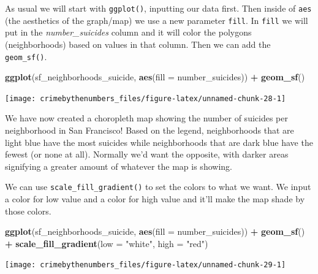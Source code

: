 \documentclass[
  12pt,
]{book}
\newenvironment{Shaded}{\begin{snugshade}}{\end{snugshade}}
\newcommand{\DataTypeTok}[1]{\textcolor[rgb]{0.27,0.27,0.27}{#1}}
\newcommand{\KeywordTok}[1]{\textcolor[rgb]{0.27,0.27,0.27}{\textbf{#1}}}
\newcommand{\NormalTok}[1]{#1}
\newcommand{\OperatorTok}[1]{\textcolor[rgb]{0.43,0.43,0.43}{\textbf{#1}}}
\newcommand{\StringTok}[1]{\textcolor[rgb]{0.5,0.5,0.5}{#1}}
\begin{document}
As usual we will start with \texttt{ggplot()}, inputting our data first. Then inside of \texttt{aes} (the aesthetics of the graph/map) we use a new parameter \texttt{fill}. In \texttt{fill} we will put in the \emph{number\_suicides} column and it will color the polygons (neighborhoods) based on values in that column. Then we can add the \texttt{geom\_sf()}.

\begin{Shaded}
\begin{Highlighting}[]
\KeywordTok{ggplot}\NormalTok{(sf\_neighborhoods\_suicide, }\KeywordTok{aes}\NormalTok{(}\DataTypeTok{fill =}\NormalTok{ number\_suicides)) }\OperatorTok{+}
\StringTok{  }\KeywordTok{geom\_sf}\NormalTok{() }
\end{Highlighting}
\end{Shaded}

\begin{center}\texttt{[image: crimebythenumbers\_files/figure-latex/unnamed-chunk-28-1]} \end{center}

We have now created a choropleth map showing the number of suicides per neighborhood in San Francisco! Based on the legend, neighborhoods that are light blue have the most suicides while neighborhoods that are dark blue have the fewest (or none at all). Normally we'd want the opposite, with darker areas signifying a greater amount of whatever the map is showing.

We can use \texttt{scale\_fill\_gradient()} to set the colors to what we want. We input a color for low value and a color for high value and it'll make the map shade by those colors.

\begin{Shaded}
\begin{Highlighting}[]
\KeywordTok{ggplot}\NormalTok{(sf\_neighborhoods\_suicide, }\KeywordTok{aes}\NormalTok{(}\DataTypeTok{fill =}\NormalTok{ number\_suicides)) }\OperatorTok{+}
\StringTok{  }\KeywordTok{geom\_sf}\NormalTok{() }\OperatorTok{+}
\StringTok{  }\KeywordTok{scale\_fill\_gradient}\NormalTok{(}\DataTypeTok{low =} \StringTok{"white"}\NormalTok{, }\DataTypeTok{high =} \StringTok{"red"}\NormalTok{) }
\end{Highlighting}
\end{Shaded}

\begin{center}\texttt{[image: crimebythenumbers\_files/figure-latex/unnamed-chunk-29-1]} \end{center}
\end{document}
